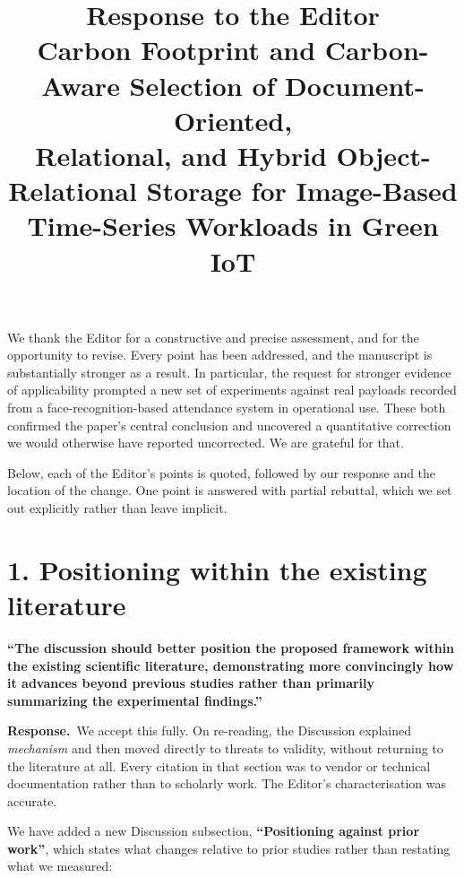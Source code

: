 \documentclass[11pt,a4paper]{article}
\title{\vspace{-1.5cm}Response to the Editor\\[2pt]
\large Carbon Footprint and Carbon-Aware Selection of Document-Oriented,\\
Relational, and Hybrid Object-Relational Storage for Image-Based\\
Time-Series Workloads in Green IoT}
\date{}
\newcommand{\point}[1]{\medskip\noindent\textbf{\color{black!75}#1}\par\smallskip}
\newcommand{\reply}{\noindent\textbf{Response.}\ }
\begin{document}
\maketitle
\vspace{-1.2cm}

\noindent We thank the Editor for a constructive and precise assessment, and for the opportunity to
revise. Every point has been addressed, and the manuscript is substantially stronger as a result. In
particular, the request for stronger evidence of applicability prompted a new set of experiments against
real payloads recorded from a face-recognition-based attendance system in operational use. These both
confirmed the paper's central conclusion and uncovered a quantitative correction we would otherwise have
reported uncorrected. We are grateful for that.

Below, each of the Editor's points is quoted, followed by our response and the location of the
change. One point is answered with partial rebuttal, which we set out explicitly rather than leave
implicit.

\section*{1. Positioning within the existing literature}

\point{``The discussion should better position the proposed framework within the existing scientific
literature, demonstrating more convincingly how it advances beyond previous studies rather than
primarily summarizing the experimental findings.''}

\reply We accept this fully. On re-reading, the Discussion explained \emph{mechanism} and then moved
directly to threats to validity, without returning to the literature at all. Every citation in that
section was to vendor or technical documentation rather than to scholarly work. The Editor's
characterisation was accurate.

We have added a new Discussion subsection, \textbf{``Positioning against prior work''}, which states
what changes relative to prior studies rather than restating what we measured:
\end{document}
